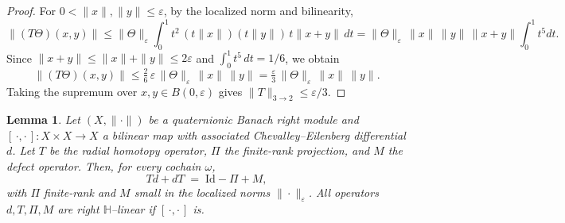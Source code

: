 \documentclass[10pt]{amsart}
\numberwithin{equation}{section}
\newtheorem{lem}[theorem]{Lemma}
\theoremstyle{remark}
\theoremstyle{definition}
\begin{document}
\begin{proof}
For $0<\|x\|,\|y\|\le\varepsilon$, by the localized norm and bilinearity,
\[
\|(T\Theta)(x,y)\|
\le \|\Theta\|_\varepsilon \int_0^1 t^{2}\,(t\|x\|)(t\|y\|)\,t\|x{+}y\|\,dt
= \|\Theta\|_\varepsilon\,\|x\|\,\|y\|\,\|x{+}y\|\int_0^1 t^{5}dt.
\]
Since $\|x{+}y\|\le \|x\|+\|y\|\le 2\varepsilon$ and $\int_0^1 t^5\,dt=1/6$, we obtain
\[
\|(T\Theta)(x,y)\|\le \tfrac{2}{6}\,\varepsilon\,\|\Theta\|_\varepsilon\,\|x\|\,\|y\|
=\tfrac{\varepsilon}{3}\,\|\Theta\|_\varepsilon\,\|x\|\,\|y\|.
\]
Taking the supremum over $x,y\in B(0,\varepsilon)$ gives $\|T\|_{3\to2}\le \varepsilon/3$.
\end{proof}




\begin{lem}\label{lem:homotopy-q}
Let $(X,\|\cdot\|)$ be a quaternionic Banach right module and
$[\,\cdot,\cdot\,]:X\times X\to X$ a bilinear map with associated
Chevalley--Eilenberg differential $d$.
Let $T$ be the radial homotopy operator, $\Pi$ the finite-rank projection,
and $M$ the defect operator. Then, for every cochain $\omega$,
\[
Td + dT \;=\; \mathrm{Id} - \Pi + M,
\]
with $\Pi$ finite-rank and $M$ small in the localized norms $\|\cdot\|_\varepsilon$.
All operators $d,T,\Pi,M$ are right $\mathbb H$--linear if $[\,\cdot,\cdot\,]$ is.
\end{lem}
\end{document}

